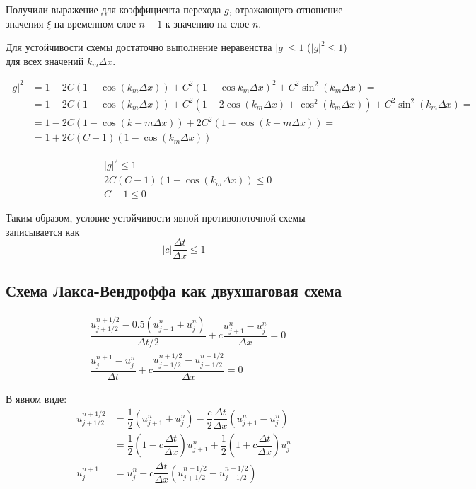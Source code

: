 Получили выражение для коэффициента перехода $g$, отражающего отношение значения $\xi$ на временном слое $n+1$ к значению на слое $n$.

Для устойчивости схемы достаточно выполнение неравенства $|g| \le 1$ ($|g|^2 \le 1$) для всех значений $k_m \Delta x$.

\begin{equation} \label{upwind_|g|^2}
\begin{split}
	|g|^2 &= 1 - 2C(1 - \cos{(k_m \Delta x)}) + C^2 (1 - \cos{k_m \Delta x})^2 + C^2 \sin^2{(k_m \Delta x)} = \\
	&= 1 - 2C (1 - \cos{(k_m \Delta x)}) + C^2 (1 - 2 \cos{(k_m \Delta x)} + \cos^2{(k_m \Delta x)}) + C^2 \sin^2{(k_m \Delta x)} = \\
	&= 1 - 2C(1 - \cos{(k-m \Delta x)}) + 2C^2 (1 - \cos{(k-m \Delta x)}) = \\
	&= 1 + 2C(C-1)(1 - \cos{(k_m\Delta x)})
\end{split}
\end{equation}

\begin{equation}
\begin{split}
	&|g|^2 \le 1 \\
	&2C(C-1)(1 - \cos{(k_m\Delta x)}) \le 0 \\
	&C-1 \le 0
\end{split}
\end{equation}

Таким образом, условие устойчивости явной противопоточной схемы записывается как
\begin{equation} \label{upwind_C<=1}
	|c| \dfrac{\Delta t}{\Delta x} \le 1
\end{equation}



\subsection{Схема Лакса-Вендроффа как двухшаговая схема}

\begin{align} \label{eq:lax-wendroff_start_1}
&\dfrac{u_{j+1/2}^{n+1/2} - 0.5 \left( u_{j+1}^n + u_j^n \right)}{\Delta t / 2} + c \dfrac{u_{j+1}^n - u_j^n}{\Delta x} = 0 \\
\label{eq:lax-wendroff_start_2}
&\dfrac{u_j^{n+1} - u_j^n}{\Delta t} + c \dfrac{u_{j+1/2}^{n+1/2} - u_{j-1/2}^{n+1/2}}{\Delta x} = 0
\end{align}

В явном виде:
\begin{align} \label{eq:lax-wendroff_start_3}
	u_{j+1/2}^{n+1/2} &= \dfrac{1}{2}\left( u_{j+1}^n + u_j^n \right) - \dfrac{c}{2} \dfrac{\Delta t}{\Delta x} \left( u_{j+1}^n - u_j^n \right) \\
	\label{eq:lax-wendroff_start_4}
	& =\dfrac{1}{2} \left( 1 - c \dfrac{\Delta t}{\Delta x} \right) u_{j+1}^n + \dfrac{1}{2} \left( 1 + c \dfrac{\Delta t}{\Delta x} \right) u_j^n \\
	\label{eq:lax-wendroff_start_5}
	u_j^{n+1} &= u_j^n - c \dfrac{\Delta t}{\Delta x} \left( u_{j+1/2}^{n+1/2} - u_{j-1/2}^{n+1/2}\right)
\end{align}

